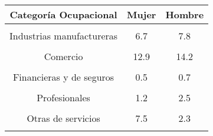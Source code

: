 \begin{tabular}[t]{ccc}
\toprule
\textbf{Categoría Ocupacional} & \textbf{Mujer} & \textbf{Hombre}\\
\midrule
\cellcolor[HTML]{B6B3FF}{Agricultura} & \cellcolor[HTML]{B6B3FF}{3.7} & \cellcolor[HTML]{B6B3FF}{23.4}\\
Industrias manufactureras & 6.7 & 7.8\\
\cellcolor[HTML]{B6B3FF}{Construcción} & \cellcolor[HTML]{B6B3FF}{0.0} & \cellcolor[HTML]{B6B3FF}{7.4}\\
Comercio & 12.9 & 14.2\\
\cellcolor[HTML]{B6B3FF}{Comunicaciones} & \cellcolor[HTML]{B6B3FF}{0.1} & \cellcolor[HTML]{B6B3FF}{0.5}\\
Financieras y de seguros & 0.5 & 0.7\\
\cellcolor[HTML]{B6B3FF}{Inmobiliarias} & \cellcolor[HTML]{B6B3FF}{0.2} & \cellcolor[HTML]{B6B3FF}{0.2}\\
Profesionales & 1.2 & 2.5\\
\cellcolor[HTML]{B6B3FF}{Administración pública} & \cellcolor[HTML]{B6B3FF}{4.1} & \cellcolor[HTML]{B6B3FF}{3.8}\\
Otras de servicios & 7.5 & 2.3\\
\cellcolor[HTML]{B6B3FF}{NS/NR} & \cellcolor[HTML]{B6B3FF}{0.1} & \cellcolor[HTML]{B6B3FF}{0.1}\\
\bottomrule
\end{tabular}
